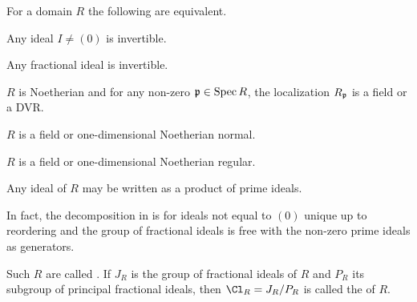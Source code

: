 \documentclass[a4paper,parskip=half,numbers=enddot, DIV=12]{scrreprt}
\begin{document}
\begin{thm}
    For a domain $R$ the following are equivalent.
    \begin{alphanumerate}
    \item 
        Any ideal $I\neq (0)$ is invertible.
    \item 
        Any fractional ideal is invertible.
    \item 
        $R$ is Noetherian and for any non-zero $\mathfrak{p}\in\operatorname{Spec} R$, the localization $R_{\mathfrak{p}}$ is a field or a DVR.
    \item 
        $R$ is a field or one-dimensional Noetherian normal.
    \item
        $R$ is a field or one-dimensional Noetherian regular.
    \item 
        Any ideal of $R$ may be written as a product of prime ideals.
    \end{alphanumerate}
    In fact, the decomposition in  is for ideals not equal to $(0)$ unique up to reordering and the group of fractional ideals is free with the non-zero prime ideals as generators.
\end{thm}
\begin{defi}
    Such $R$ are called . If $J_R$ is the group of fractional ideals of $R$ and $P_R$ its subgroup of principal fractional ideals, then  $\Cl_R = J_R/P_R$ is called the  of $R$.
\end{defi}
\end{document}
